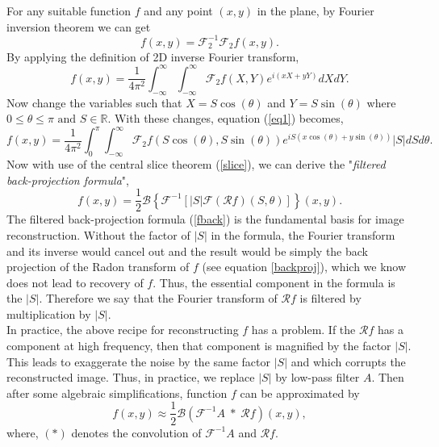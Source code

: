 For any suitable function $f$ and any point $(x,y)$ in the plane, by Fourier inversion theorem we can get
$$
f(x,y)=\mathscr{F}^{-1}_{2} \mathscr{F}_{2} f(x,y).
$$
By applying the definition of 2D inverse Fourier transform,
\begin{equation}\label{eq1}
f(x,y)=\dfrac{1}{4 \pi^2} \int^{\infty}_{-\infty} \int^{\infty}_{-\infty} \mathscr{F}_{2}f(X,Y) e^{i (xX+yY)} dX dY.
\end{equation}
Now change the variables such that $X=S \cos(\theta)$ and $Y=S \sin(\theta)$ where $0 \leq \theta \leq \pi \text{ and } S \in \mathbb{R}$. 
With these changes, equation (\ref{eq1}) becomes,
\begin{equation}\label{eq2}
f(x,y)=\dfrac{1}{4 \pi^2} \int^{\pi}_{0} \int^{\infty}_{-\infty} \mathscr{F}_{2}f(S\cos(\theta),S\sin(\theta)) e^{i S (x\cos(\theta)+y\sin(\theta))} |S|dS d\theta.
\end{equation}
Now with use of the central slice theorem (\ref{slice}), we can derive the "\textit{filtered back-projection formula}",
\begin{equation}\label{fback}
f(x,y) = \dfrac{1}{2} \mathscr{B} \left\lbrace  \mathscr{F}^{-1}\left[ |S|\mathscr{F} (\mathscr{R}f)(S,\theta) \right]  \right\rbrace (x,y).
\end{equation}
The filtered back-projection formula (\ref{fback}) is the fundamental basis for image reconstruction. Without the factor of $|S|$ in the formula, the Fourier transform and its inverse would cancel out and the result would be simply the back projection of the Radon transform of $f$ (see equation \ref{backproj}), which we know does not lead to recovery of $f$. Thus, the essential component in the formula is the $|S|$. Therefore we say that the Fourier transform of $\mathscr{R}f$ is filtered by multiplication by $|S|$.\\

\noindent
In practice, the above recipe for reconstructing $f$ has a problem. If the  $\mathscr{R}f$ has a component at high frequency, then that component is magnified by the factor $|S|$. This leads to exaggerate the noise by the same factor $|S|$ and which corrupts the reconstructed image. Thus, in practice, we replace $|S|$ by low-pass filter $A$.  
Then after some algebraic simplifications, function $f$ can be approximated by
\begin{equation}\label{modeqn}
f(x,y) \approx \frac{1}{2} \mathscr{B}(\mathscr{F}^{-1}A \; * \; \mathscr{R}f)(x,y),
\end{equation}
where, $(*)$ denotes the convolution of $\mathscr{F}^{-1}A$ and $\mathscr{R}f$. \\

